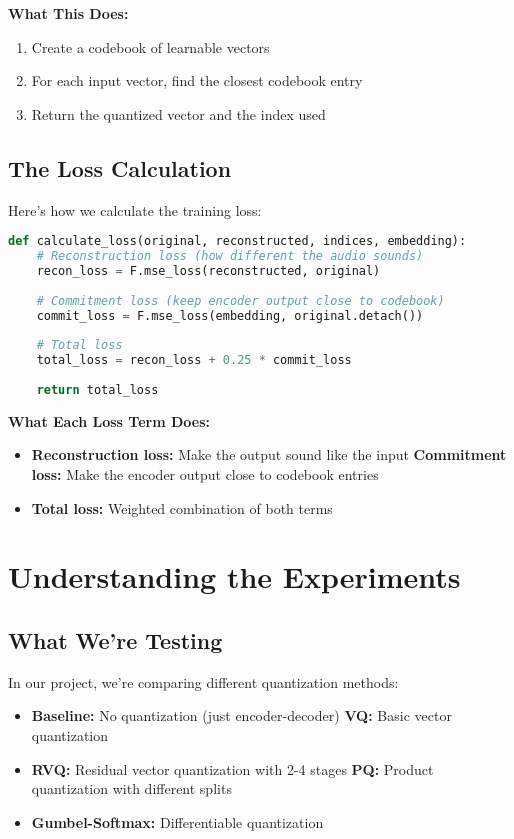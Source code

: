 \documentclass[12pt]{article}
\begin{document}
\textbf{What This Does:}
\begin{enumerate}
    \item Create a codebook of learnable vectors
    \item For each input vector, find the closest codebook entry
    \item Return the quantized vector and the index used
\end{enumerate}

\subsection{The Loss Calculation}

Here's how we calculate the training loss:

\begin{lstlisting}[language=Python, basicstyle=\small]
def calculate_loss(original, reconstructed, indices, embedding):
    # Reconstruction loss (how different the audio sounds)
    recon_loss = F.mse_loss(reconstructed, original)
    
    # Commitment loss (keep encoder output close to codebook)
    commit_loss = F.mse_loss(embedding, original.detach())
    
    # Total loss
    total_loss = recon_loss + 0.25 * commit_loss
    
    return total_loss
\end{lstlisting}

\textbf{What Each Loss Term Does:}
\begin{itemize}
    \item \textbf{Reconstruction loss:} Make the output sound like the input
    \textbf{Commitment loss:} Make the encoder output close to codebook entries
    \item \textbf{Total loss:} Weighted combination of both terms
\end{itemize}

\section{Understanding the Experiments}

\subsection{What We're Testing}

In our project, we're comparing different quantization methods:
\begin{itemize}
    \item \textbf{Baseline:} No quantization (just encoder-decoder)
    \textbf{VQ:} Basic vector quantization
    \item \textbf{RVQ:} Residual vector quantization with 2-4 stages
    \textbf{PQ:} Product quantization with different splits
    \item \textbf{Gumbel-Softmax:} Differentiable quantization
\end{itemize}
\end{document}
